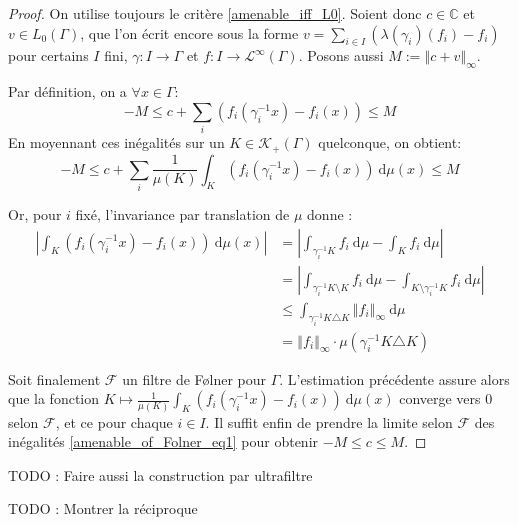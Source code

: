 \documentclass[a4paper,12pt]{article}
\newcommand{\C}{\mathbb{C}}
\newcommand{\norm}[1]{\left\Vert #1\right\Vert}
\newcommand{\abs}[1]{\left\vert#1\right\vert}
\newcommand{\integral}[4]{\int_{#1}^{#2} #3~\mathrm{d}#4}
\newcommand{\inv}{^{-1}}
\newcommand{\TODO}[1]{{\color{red}TODO :} #1}
\begin{document}
\begin{proof}
    On utilise toujours le critère \ref{amenable_iff_L0}. Soient donc $c\in\C$ et $v\in L_0(\Gamma)$, 
    que l'on écrit encore sous la forme $v = \sum_{i\in I} (\lambda(\gamma_i)(f_i) - f_i)$ pour certains $I$ fini, $\gamma : I \to\Gamma$ et
    $f : I\to\mathscr{L}^\infty(\Gamma)$. Posons aussi $M := \norm{c + v}_\infty$.

    Par définition, on a $\forall x\in\Gamma$:
    \begin{equation*}
        -M \le c + \sum_i (f_i(\gamma_i\inv x) - f_i(x)) \le M
    \end{equation*}
    En moyennant ces inégalités sur un $K\in\mathcal{K}_+(\Gamma)$ quelconque, on obtient:
    \begin{equation}\label{amenable_of_Folner_eq1}
        -M \le c + \sum_i \frac1{\mu(K)} \integral{K}{}{(f_i(\gamma_i\inv x) - f_i(x))}{\mu(x)} \le M
    \end{equation}

    Or, pour $i$ fixé, l'invariance par translation de $\mu$ donne :
    \begin{align*}
        \abs{\integral{K}{}{(f_i(\gamma_i\inv x) - f_i(x))}{\mu(x)}} 
            &= \abs{\integral{\gamma_i\inv K}{}{f_i}{\mu} - \integral{K}{}{f_i}{\mu}} \\
            &= \abs{\integral{\gamma_i\inv K\setminus K}{}{f_i}{\mu} - \integral{K\setminus\gamma_i\inv K}{}{f_i}{\mu}} \\
            &\le \integral{\gamma_i\inv K\triangle K}{}{\norm{f_i}_\infty}{\mu} \\
            &=\norm{f_i}_\infty \cdot \mu(\gamma_i\inv K\triangle K)
    \end{align*}
    
    Soit finalement $\mathscr{F}$ un filtre de F\o{}lner pour $\Gamma$. L'estimation précédente assure alors que
    la fonction $K\mapsto\frac1{\mu(K)} \integral{K}{}{(f_i(\gamma_i\inv x) - f_i(x))}{\mu(x)}$ converge vers $0$
    selon $\mathscr{F}$, et ce pour chaque $i\in I$. Il suffit enfin de prendre la limite selon $\mathscr{F}$ des inégalités \ref{amenable_of_Folner_eq1}
    pour obtenir $-M\le c\le M$. 
\end{proof}

\TODO{Faire aussi la construction par ultrafiltre}

\TODO{Montrer la réciproque}
\end{document}
